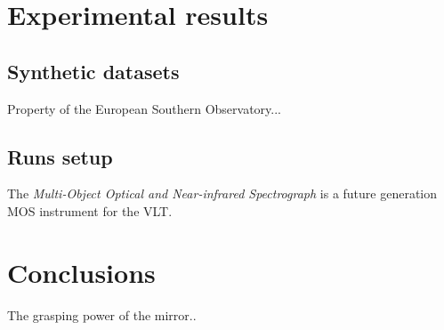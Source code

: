 \documentclass[binding=0.6cm,LaM]{sapthesis}
\begin{document}
\chapter{Experimental results}
\label{chap:4}

\section{Synthetic datasets}
\label{sec:syns}
Property of the European Southern Observatory...

\section{Runs setup}
\label{sec:moons}
The \textit{Multi-Object Optical and Near-infrared Spectrograph} is a future generation MOS instrument for the VLT. 


\chapter{Conclusions}
\label{chap:5} 
The grasping power of the mirror..





\backmatter
\cleardoublepage %

\printbibheading
\printbibliography[type=article,heading=subbibliography,title={Articles}]
\printbibliography[type=inproceedings,heading=subbibliography,title={Inproceedings}]
\printbibliography[type=misc,heading=subbibliography,title={Miscellaneous}]
\end{document}
